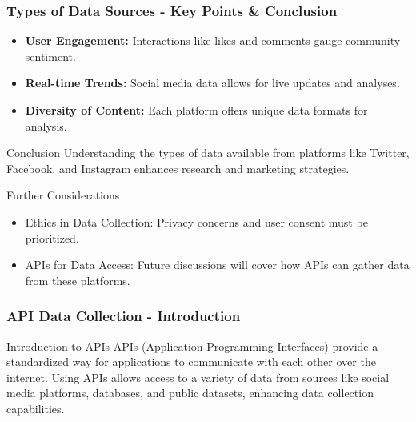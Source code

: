 \documentclass{beamer}
\begin{document}
\begin{frame}[fragile]
    \frametitle{Types of Data Sources - Key Points & Conclusion}
    \begin{itemize}
        \item \textbf{User Engagement:} Interactions like likes and comments gauge community sentiment.
        \item \textbf{Real-time Trends:} Social media data allows for live updates and analyses.
        \item \textbf{Diversity of Content:} Each platform offers unique data formats for analysis.
    \end{itemize}
    
    \begin{block}{Conclusion}
        Understanding the types of data available from platforms like Twitter, Facebook, and Instagram enhances research and marketing strategies.
    \end{block}

    \begin{block}{Further Considerations}
        \begin{itemize}
            \item Ethics in Data Collection: Privacy concerns and user consent must be prioritized.
            \item APIs for Data Access: Future discussions will cover how APIs can gather data from these platforms.
        \end{itemize}
    \end{block}
\end{frame}

\begin{frame}[fragile]
    \frametitle{API Data Collection - Introduction}
    \begin{block}{Introduction to APIs}
        APIs (Application Programming Interfaces) provide a standardized way for applications to communicate with each other over the internet. Using APIs allows access to a variety of data from sources like social media platforms, databases, and public datasets, enhancing data collection capabilities.
    \end{block}
\end{frame}
\end{document}
